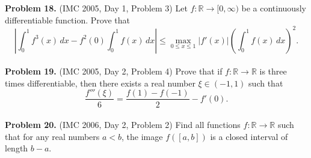 \documentclass{article}
\begin{document}
\textbf{Problem 18.} (IMC 2005, Day 1, Problem 3)
Let \( f : \mathbb{R} \to [0, \infty) \) be a continuously differentiable function. Prove that
\[
\left| \int_0^1 f^3(x)\, dx - f^2(0) \int_0^1 f(x)\, dx \right|
\leq \max_{0 \leq x \leq 1} |f'(x)| \left( \int_0^1 f(x)\, dx \right)^2.
\]
\\

\textbf{Problem 19.} (IMC 2005, Day 2, Problem 4)
Prove that if \( f : \mathbb{R} \to \mathbb{R} \) is three times differentiable, then there exists a real number \( \xi \in (-1, 1) \) such that
\[
\frac{f'''(\xi)}{6} = \frac{f(1) - f(-1)}{2} - f'(0).
\]
\\

\textbf{Problem 20.} (IMC 2006, Day 2, Problem 2)
Find all functions \( f : \mathbb{R} \to \mathbb{R} \) such that for any real numbers \( a < b \), the image \( f([a, b]) \)
is a closed interval of length \( b - a \).
\end{document}
